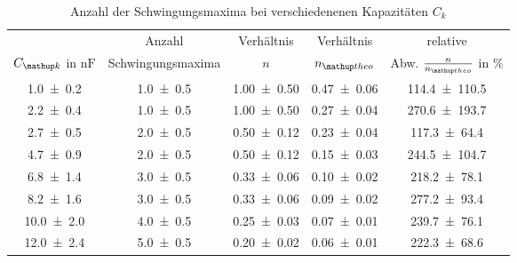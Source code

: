 \begin{table} 
\centering 
\caption{Anzahl der Schwingungsmaxima bei verschiedenenen Kapazitäten $C_k$} 
\label{teila_n_ck} 
\begin{tabular}{S S S S S } 
\toprule  
{} & {Anzahl} & {Verhältnis} & { Verhältnis } & {relative }  \\ 
{$C\ua{k}$ in $\si{\nano\farad}$} & {Schwingungsmaxima} & {$n$ } & {$n\ua{theo}$} & {Abw. $\frac{n}{n\ua{theo}}$ in \%} \\
\midrule  
 \num{1.0\pm0.2} & \num{1.0\pm0.5} & \num{1.00\pm0.50} & \num{0.47\pm0.06} & \num{114.4\pm110.5}\\ 
\num{2.2\pm0.4} & \num{1.0\pm0.5} & \num{1.00\pm0.50} & \num{0.27\pm0.04} & \num{270.6\pm193.7}\\ 
\num{2.7\pm0.5} & \num{2.0\pm0.5} & \num{0.50\pm0.12} & \num{0.23\pm0.04} & \num{117.3\pm64.4}\\ 
\num{4.7\pm0.9} & \num{2.0\pm0.5} & \num{0.50\pm0.12} & \num{0.15\pm0.03} & \num{244.5\pm104.7}\\ 
\num{6.8\pm1.4} & \num{3.0\pm0.5} & \num{0.33\pm0.06} & \num{0.10\pm0.02} & \num{218.2\pm78.1}\\ 
\num{8.2\pm1.6} & \num{3.0\pm0.5} & \num{0.33\pm0.06} & \num{0.09\pm0.02} & \num{277.2\pm93.4}\\ 
\num{10.0\pm2.0} & \num{4.0\pm0.5} & \num{0.25\pm0.03} & \num{0.07\pm0.01} & \num{239.7\pm76.1}\\ 
\num{12.0\pm2.4} & \num{5.0\pm0.5} & \num{0.20\pm0.02} & \num{0.06\pm0.01} & \num{222.3\pm68.6}\\ 
\bottomrule 
\end{tabular} 
\end{table}
